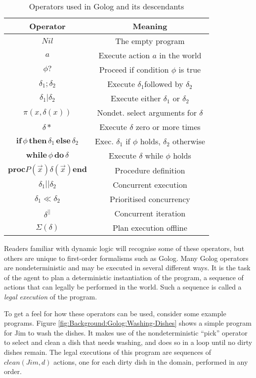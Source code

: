 %
\begin{table}
\begin{centering}
\begin{tabular}{|c|c|}
\hline 
Operator  & Meaning\tabularnewline
\hline
\hline 
$Nil$  & The empty program\tabularnewline
\hline 
$a$  & Execute action $a$ in the world\tabularnewline
\hline 
$\phi?$  & Proceed if condition $\phi$ is true\tabularnewline
\hline 
$\delta_{1};\delta_{2}$  & Execute $\delta_{1}$followed by $\delta_{2}$\tabularnewline
\hline 
$\delta_{1}|\delta_{2}$  & Execute either $\delta_{1}$ or $\delta_{2}$\tabularnewline
\hline 
$\pi(x,\delta(x))$  & Nondet. select arguments for $\delta$\tabularnewline
\hline 
$\delta*$  & Execute $\delta$ zero or more times\tabularnewline
\hline 
$\mathbf{if}\,\phi\,\mathbf{then}\,\delta_{1}\,\mathbf{else}\,\delta_{2}$  & Exec. $\delta_{1}$ if $\phi$ holds, $\delta_{2}$ otherwise\tabularnewline
\hline 
$\mathbf{while\,}\phi\mathbf{\, do}\,\delta$  & Execute $\delta$ while $\phi$ holds\tabularnewline
\hline 
$\mathbf{proc}P(\overrightarrow{x})\delta(\overrightarrow{x})\mathbf{end}$  & Procedure definition\tabularnewline
\hline 
$\delta_{1}||\delta_{2}$  & Concurrent execution\tabularnewline
\hline 
$\delta_{1}\ll\delta_{2}$  & Prioritised concurrency\tabularnewline
\hline 
$\delta^{||}$  & Concurrent iteration\tabularnewline
\hline 
$\Sigma(\delta)$  & Plan execution offline\tabularnewline
\hline
\end{tabular}
\par\end{centering}

\caption{Operators used in Golog and its descendants \label{tbl:Background:Golog-Operators} }

\end{table}


Readers familiar with dynamic logic will recognise some of these operators,
but others are unique to first-order formalisms such as Golog. Many
Golog operators are nondeterministic and may be executed in several
different ways. It is the task of the agent to plan a deterministic
instantiation of the program, a sequence of actions that can legally
be performed in the world. Such a sequence is called a \emph{legal
execution} of the program.

To get a feel for how these operators can be used, consider some example
programs. Figure \ref{fig:Background:Golog:Washing-Dishes} shows
a simple program for Jim to wash the dishes. It makes use of the nondeterministic
{}``pick'' operator to select and clean a dish that needs washing,
and does so in a loop until no dirty dishes remain. The legal executions
of this program are sequences of $clean(Jim,d)$ actions, one for
each dirty dish in the domain, performed in any order.

